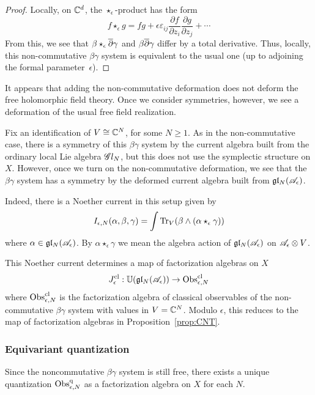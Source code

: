 \begin{proof}
Locally, on $\mathbb C^d$, the $\star_{\epsilon}$-product has the form
\[
f \star_{\epsilon} g = fg + \epsilon \varepsilon_{ij} \frac{\partial f}{\partial z_i} \frac{\partial g}{\partial z_j} + \cdots
\]
From this, we see that $\beta \star_{\epsilon} \overline{\partial} \gamma$ and $\beta \overline{\partial} \gamma$ differ by a total derivative. 
Thus, locally, this non-commutative $\beta\gamma$ system is equivalent to the usual one (up to adjoining the formal parameter~$\epsilon$).
\end{proof}

It appears that adding the non-commutative deformation does not deform the free holomorphic field theory. 
Once we consider symmetries, however, we see a deformation of the usual free field realization. 

Fix an identification of $V \cong \mathbb C^N$, for some $N \geq 1$. 
As in the non-commutative case, there is a symmetry of this $\beta\gamma$ system by the current algebra built from the ordinary local Lie algebra $\mathscr G l_N$, but this does not use the symplectic structure on $X$. 
However, once we turn on the non-commutative deformation, we see that the $\beta\gamma$ system has a symmetry by the deformed current algebra built from $\mathfrak{g} \mathfrak{l}_N(\mathscr A_{\epsilon})$. 

Indeed, there is a Noether current in this setup given by
\[
I_{\epsilon,N} (\alpha, \beta,\gamma) = \int {\rm Tr}_{V}(\beta \wedge (\alpha \star_{\epsilon} \gamma)) 
\]
where $\alpha \in \mathfrak{g} \mathfrak{l}_N(\mathscr A_{\epsilon})$.
By $\alpha \star_\epsilon \gamma$ we mean the algebra action of $\mathfrak{g} \mathfrak{l}_N(\mathscr A_{\epsilon})$ on $\mathscr A_\epsilon \otimes V$. 

\begin{lem}
This Noether current determines a map of factorization algebras on $X$
\[
J^{\rm cl}_\epsilon: \mathbb U(\mathfrak{g} \mathfrak{l}_N(\mathscr A_{\epsilon})) \to {\rm Obs}^{{\rm cl}}_{\epsilon, N}
\]
where ${\rm Obs}^{{\rm cl}}_{\epsilon, N}$ is the factorization algebra of classical observables of the non-commutative $\beta\gamma$ system with values in $V = \mathbb C^N$.
Modulo $\epsilon$, this reduces to the map of factorization algebras in Proposition~\ref{prop:CNT}.
\end{lem}

\subsubsection{Equivariant quantization}

Since the noncommutative $\beta\gamma$ system is still free, there exists a unique quantization ${\rm Obs}^{\rm q}_{\epsilon, N}$ as a factorization algebra on $X$ for each $N$. 

